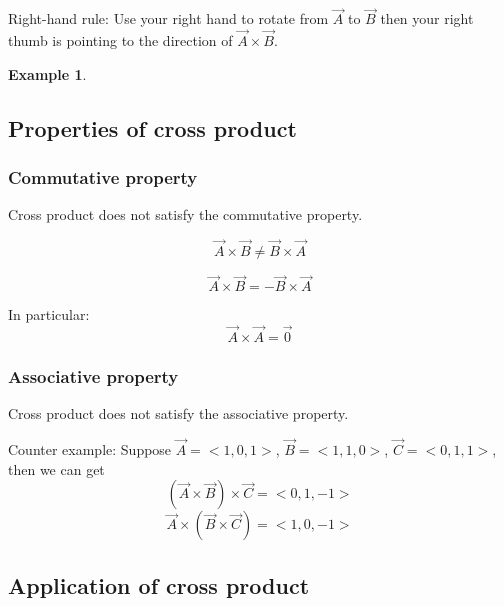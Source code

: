 \documentclass{article}
\newtheorem{example}{Example}
\begin{document}
Right-hand rule: Use your right hand to rotate from $\vec{A}$ to $\vec{B}$ then
your right thumb is pointing to the direction of $\vec{A} \times \vec{B}$.

\begin{example}
  
\end{example}

\subsection{Properties of cross product}

\subsubsection{Commutative property}
Cross product does not satisfy the commutative property.

\[
  \vec{A} \times \vec{B} \neq \vec{B} \times \vec{A}
\]

\[
  \vec{A} \times \vec{B} = - \vec{B} \times \vec{A}
\]

In particular:
\[
  \vec{A} \times \vec{A} = \vec{0}
\]

\subsubsection{Associative property}
Cross product does not satisfy the associative property.

Counter example: Suppose $\vec{A} = <1, 0, 1>$, $\vec{B} = <1, 1, 0>$,
$\vec{C} = <0, 1, 1>$, then we can get
\[
  (\vec{A} \times \vec{B}) \times \vec{C} = <0, 1, -1>
\]
\[
  \vec{A} \times (\vec{B} \times \vec{C}) = <1, 0, -1>
\]

\subsection{Application of cross product}
\end{document}
